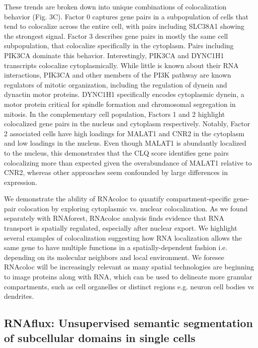 These trends are broken down into unique combinations of colocalization behavior (Fig. 3C). Factor 0 captures gene pairs in a subpopulation of cells that tend to colocalize across the entire cell, with pairs including SLC38A1 showing the strongest signal. Factor 3 describes gene pairs in mostly the same cell subpopulation, that colocalize specifically in the cytoplasm. Pairs including PIK3CA dominate this behavior. Interestingly, PIK3CA and DYNC1H1 transcripts colocalize cytoplasmically. While little is known about their RNA interactions, PIK3CA and other members of the PI3K pathway are known regulators of mitotic organization, including the regulation of dynein and dynactin motor proteins. DYNC1H1 specifically encodes cytoplasmic dynein, a motor protein critical for spindle formation and chromosomal segregation in mitosis\cite{gassmannDyneinKinetochore2023}. In the complementary cell population, Factors 1 and 2 highlight colocalized gene pairs in the nucleus and cytoplasm respectively. Notably, Factor 2 associated cells have high loadings for MALAT1 and CNR2 in the cytoplasm and low loadings in the nucleus. Even though MALAT1 is abundantly localized to the nucleus, this demonstrates that the CLQ score identifies gene pairs colocalizing more than expected given the overabundance of MALAT1 relative to CNR2, whereas other approaches seem confounded by large differences in expression\cite{kumarIntracellularSpatialTranscriptomic2023}.

We demonstrate the ability of RNAcoloc to quantify compartment-specific gene-pair colocation by exploring cytoplasmic vs. nuclear colocalization. As we found separately with RNAforest, RNAcoloc analysis finds evidence that RNA transport is spatially regulated, especially after nuclear export. We highlight several examples of colocalization suggesting how RNA localization allows the same gene to have multiple functions in a spatially-dependent fashion i.e. depending on its molecular neighbors and local environment\cite{guptaMoonlightingEnzymesWhen2023,gnannIlluminatingNongeneticCellular2021}. We foresee RNAcoloc will be increasingly relevant as many spatial technologies are beginning to image proteins along with RNA, which can be used to delineate more granular  compartments, such as cell organelles or distinct regions e.g. neuron cell bodies vs dendrites. 

\subsection{RNAflux: Unsupervised semantic segmentation of subcellular domains in single cells}

